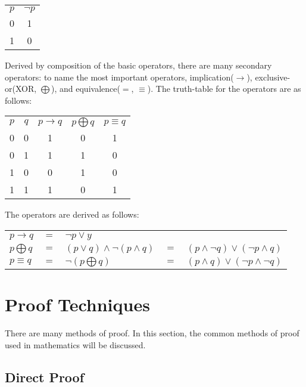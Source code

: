 \documentclass{report}
\begin{document}
	\begin{center}
	\begin{tabular}{cc}
		$p$ & $\neg p$\\
		0 & 1\\
		1 & 0
	\end{tabular}
	\end{center}
	
	Derived by composition of the basic operators, there are many secondary operators: to name the most important operators, implication($\rightarrow$), exclusive-or(XOR, $\bigoplus$), and equivalence($=$, $\equiv$). The truth-table for the operators are as follows:
	
	\begin{center}
	\begin{tabular}{ccccc}
		$p$ & $q$ & $p \rightarrow q$ & $p \bigoplus q$ & $p \equiv q$ \\
		0   & 0   & 1                 & 0               & 1     \\
		0   & 1   & 1                 & 1               & 0     \\
		1   & 0   & 0                 & 1               & 0     \\
		1   & 1   & 1                 & 0               & 1    
	\end{tabular}
	\end{center}
	
	The operators are derived as follows:\\
	\begin{center}
	\begin{tabular}{lllll}
		$p \rightarrow q$ & $=$ & $\neg p \vee y$                       &   &                                          \\
		$p \bigoplus q$   & $=$ & $(p \vee q) \wedge \neg (p \wedge q)$ & $=$ & $(p \wedge \neg q) \vee (\neg p \wedge q)$ \\
		$p \equiv q$      & $=$ & $\neg (p \bigoplus q)$                & $=$ & $(p \wedge q) \vee (\neg p \wedge \neg q)$
	\end{tabular}
	\end{center}
	
	
	
	\section{Proof Techniques}
	There are many methods of proof. In this section, the common methods of proof used in mathematics will be discussed.
	\subsection{Direct Proof}
	
\end{document}
